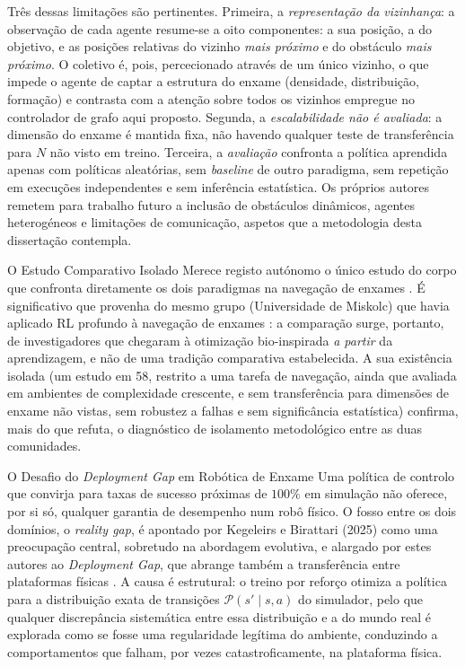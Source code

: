 \documentclass[12pt,reqno, twoside]{amsbook}
\makeatletter
\def\section{\@startsection{section}{1}%
      \z@{.5\linespacing\@plus.7\linespacing}{.25\linespacing}%
      {\normalfont\bfseries\flushleft}}
\def\subsection{\@startsection{subsection}{2}%
      \z@{.5\linespacing\@plus.7\linespacing}{.25\linespacing}%
      {\normalfont\bfseries\flushleft}}
\theoremstyle{plain}
\numberwithin{equation}{chapter}
\numberwithin{section}{chapter}
\numberwithin{table}{chapter}
\numberwithin{figure}{chapter}
\makeatother
\begin{document}
Três dessas limitações são pertinentes. Primeira, a \emph{representação da vizinhança}: a observação de cada agente resume-se a oito componentes: a sua posição, a do objetivo, e as posições relativas do vizinho \emph{mais próximo} e do obstáculo \emph{mais próximo}. O coletivo é, pois, percecionado através de um único vizinho, o que impede o agente de captar a estrutura do enxame (densidade, distribuição, formação) e contrasta com a atenção sobre todos os vizinhos empregue no controlador de grafo aqui proposto. Segunda, a \emph{escalabilidade não é avaliada}: a dimensão do enxame é mantida fixa, não havendo qualquer teste de transferência para $N$ não visto em treino. Terceira, a \emph{avaliação} confronta a política aprendida apenas com políticas aleatórias, sem \textit{baseline} de outro paradigma, sem repetição em execuções independentes e sem inferência estatística. Os próprios autores remetem para trabalho futuro a inclusão de obstáculos dinâmicos, agentes heterogéneos e limitações de comunicação, aspetos que a metodologia desta dissertação contempla.

\subsection{O Estudo Comparativo Isolado}
Merece registo autónomo o único estudo do corpo que confronta diretamente os dois paradigmas na navegação de enxames \cite{iskandar2024comparative}. É significativo que provenha do mesmo grupo (Universidade de Miskolc) que havia aplicado RL profundo à navegação de enxames \cite{iskandar2023navigation}: a comparação surge, portanto, de investigadores que chegaram à otimização bio-inspirada \emph{a partir} da aprendizagem, e não de uma tradição comparativa estabelecida. A sua existência isolada (um estudo em 58, restrito a uma tarefa de navegação, ainda que avaliada em ambientes de complexidade crescente, e sem transferência para dimensões de enxame não vistas, sem robustez a falhas e sem significância estatística) confirma, mais do que refuta, o diagnóstico de isolamento metodológico entre as duas comunidades.

\section{O Desafio do \textit{Deployment Gap} em Robótica de Enxame}
\label{sec:deployment_gap}
Uma política de controlo que convirja para taxas de sucesso próximas de $100\%$ em simulação não oferece, por si só, qualquer garantia de desempenho num robô físico. O fosso entre os dois domínios, o \textit{reality gap}, é apontado por Kegeleirs e Birattari (2025) como uma preocupação central, sobretudo na abordagem evolutiva, e alargado por estes autores ao \textit{Deployment Gap}, que abrange também a transferência entre plataformas físicas \cite{kegeleirs2025towards}. A causa é estrutural: o treino por reforço otimiza a política para a distribuição exata de transições $\mathcal{P}(s' \mid s, a)$ do simulador, pelo que qualquer discrepância sistemática entre essa distribuição e a do mundo real é explorada como se fosse uma regularidade legítima do ambiente, conduzindo a comportamentos que falham, por vezes catastroficamente, na plataforma física.
\end{document}
